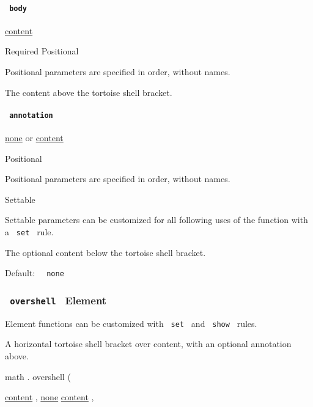 \paragraph{\texorpdfstring{\texttt{\ body\ }}{ body }}\label{functions-undershell-body}

\href{/docs/reference/foundations/content/}{content}

{Required} {{ Positional }}

\label{functions-undershell-body-positional-tooltip}
Positional parameters are specified in order, without names.

The content above the tortoise shell bracket.

\paragraph{\texorpdfstring{\texttt{\ annotation\ }}{ annotation }}\label{functions-undershell-annotation}

\href{/docs/reference/foundations/none/}{none} {or}
\href{/docs/reference/foundations/content/}{content}

{{ Positional }}

\label{functions-undershell-annotation-positional-tooltip}
Positional parameters are specified in order, without names.

{{ Settable }}

\label{functions-undershell-annotation-settable-tooltip}
Settable parameters can be customized for all following uses of the
function with a \texttt{\ set\ } rule.

The optional content below the tortoise shell bracket.

Default: \texttt{\ }{\texttt{\ none\ }}\texttt{\ }

\subsubsection{\texorpdfstring{\texttt{\ overshell\ } {{ Element
}}}{ overshell   Element }}\label{functions-overshell}

\label{functions-overshell-element-tooltip}
Element functions can be customized with \texttt{\ set\ } and
\texttt{\ show\ } rules.

A horizontal tortoise shell bracket over content, with an optional
annotation above.

math { . } { overshell } (

{ \href{/docs/reference/foundations/content/}{content} , } {
\hyperref[functions-overshell-parameters-annotation]{}
\href{/docs/reference/foundations/none/}{none}
\href{/docs/reference/foundations/content/}{content} , }

